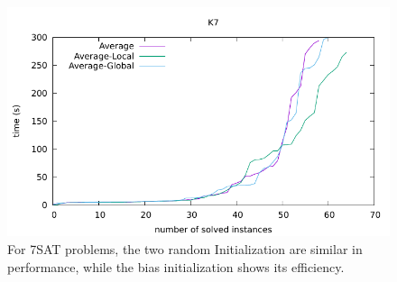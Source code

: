 \documentclass[12pt,a4paper,twoside]{scrartcl}
\numberwithin{equation}{section}
\begin{document}
  \begin{figure}[H]
\begin{center}
  \includegraphics[scale = 1]{DATA/K7/e3a.pdf}
  \end{center}
  \caption{For 7SAT problems, the two random Initialization are similar in performance, while the bias initialization shows its efficiency.}
  \label{Experiment 4 k7-a cactus plot}
  \end{figure}
\end{document}
